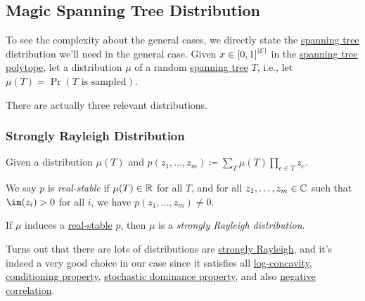 \subsection{Magic Spanning Tree Distribution}
To see the complexity about the general cases, we directly state the \hyperref[def:spanning-tree]{spanning tree} distribution we'll need in the general case. Given \(x\in \left[ 0, 1 \right] ^{\left\vert \mathcal{\MakeUppercase{e}}  \right\vert }\) in the \hyperref[eq:spanning-tree-polytope]{spanning tree polytope}, let a distribution \(\mu \) of a random \hyperref[def:spanning-tree]{spanning tree} \(T\), i.e., let \(\mu (T) = \Pr(T\text{ is sampled})\).

There are actually three relevant distributions.

\subsubsection{Strongly Rayleigh Distribution}
\begin{definition*}
	Given a distribution \(\mu (T)\) and \(p(z_1, \ldots , z_m ) \coloneqq \sum_{T} \mu (T) \prod_{e\in T} z_e\).
	\begin{definition}\label{def:real-stable}
		We say \(p\) is \emph{real-stable} if \(\mu (T)\in \mathbb{\MakeUppercase{r}} \) for all \(T\), and for all \(z_1, \ldots  , z_m\in \mathbb{\MakeUppercase{c}} \) such that \(\im(z_i) > 0\) for all \(i\), we have \(p(z_1, \ldots , z_m ) \neq 0\).
	\end{definition}
	\begin{definition}\label{def:strongly-Rayleigh-distribution}
		If \(\mu \) induces a \hyperref[def:real-stable]{real-stable} \(p\), then \(\mu\) is a \emph{strongly Rayleigh distribution}.
	\end{definition}
\end{definition*}

Turns out that there are lots of distributions are \hyperref[def:strongly-Rayleigh-distribution]{strongly Rayleigh}, and it's indeed a very good choice in our case since it satisfies  all \hyperref[subsub:log-concavity]{log-concavity}, \hyperref[subsub:conditioning]{conditioning property}, \hyperref[subsub:stochastic-dominance]{stochastic dominance property}, and also \hyperref[subsub:negative-correlation]{negative correlation}.


